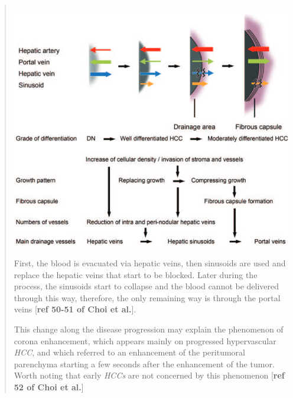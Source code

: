 \documentclass[]{article}
\begin{document}
\begin{quote}
\includegraphics[width=5.19078in,height=4.41133in]{./images/media/image10.png}\\
First, the blood is evacuated via hepatic veins, then sinusoids are used
and replace the hepatic veins that start to be blocked. Later during the
process, the sinusoids start to collapse and the blood cannot be
delivered through this way, therefore, the only remaining way is through
the portal veins {[}\textbf{ref 50-51 of Choi et al.}{]}.

This change along the disease progression may explain the phenomenon of
corona enhancement, which appears mainly on progressed hypervascular
\emph{HCC}, and which referred to an enhancement of the peritumoral
parenchyma starting a few seconds after the enhancement of the tumor.
Worth noting that early \emph{HCCs} are not concerned by this phenomenon
{[}\textbf{ref 52 of Choi et al.}{]}
\end{quote}
\end{document}
